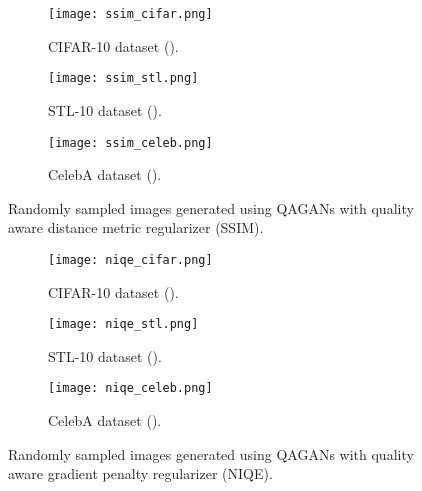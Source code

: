 \documentclass{article}
\begin{document}
\begin{figure*}[htbp]
\captionsetup[subfigure]{justification=centering}
\centering
\begin{subfigure}[b]{0.32\textwidth}
\texttt{[image: ssim\_cifar.png]}
\caption{CIFAR-10 dataset ().}
\label{fig:ssim_cifar}
\end{subfigure}
\begin{subfigure}[b]{0.32\textwidth}
\texttt{[image: ssim\_stl.png]}
\caption{STL-10 dataset ().}
\label{fig:ssim_stl}
\end{subfigure}
\begin{subfigure}[b]{0.32\textwidth}
\texttt{[image: ssim\_celeb.png]}
\caption{CelebA dataset ().}
\label{fig:ssim_celeb}
\end{subfigure}

\caption{Randomly sampled images generated using QAGANs with quality aware distance metric regularizer (SSIM).}
\label{fig:ssim}
\end{figure*}

\begin{figure*}[htbp]
\captionsetup[subfigure]{justification=centering}
\centering
\vspace{-0.3cm}
\begin{subfigure}[b]{0.32\textwidth}
\texttt{[image: niqe\_cifar.png]}
\caption{CIFAR-10 dataset ().}
\label{fig:niqe_cifar}
\end{subfigure}
\begin{subfigure}[b]{0.32\textwidth}
\texttt{[image: niqe\_stl.png]}
\caption{STL-10 dataset ().}
\label{fig:niqe_stl}
\end{subfigure}
\begin{subfigure}[b]{0.32\textwidth}
\texttt{[image: niqe\_celeb.png]}
\caption{CelebA dataset ().}
\label{fig:niqe_celeb}
\end{subfigure}
\caption{
{Randomly sampled images generated using QAGANs with quality aware gradient penalty regularizer (NIQE).}}
\label{fig:niqe}
\end{figure*}
\end{document}
